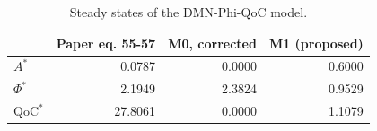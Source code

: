 \begin{table}
\caption{Steady states of the DMN-Phi-QoC model.}
\label{tab:table1_steady_states}
\begin{tabular}{lrrr}
\toprule
 & Paper eq. 55-57 & M0, corrected & M1 (proposed) \\
\midrule
$A^*$ & 0.0787 & 0.0000 & 0.6000 \\
$\Phi^*$ & 2.1949 & 2.3824 & 0.9529 \\
$\mathrm{QoC}^*$ & 27.8061 & 0.0000 & 1.1079 \\
\bottomrule
\end{tabular}
\end{table}
